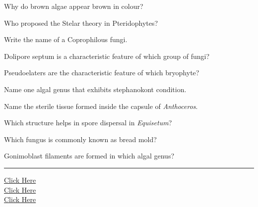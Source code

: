 \documentclass[11pt,a4paper]{article}
\begin{document}
\begin{parts}
  \item Why do brown algae appear brown in colour?
  \item Who proposed the Stelar theory in Pteridophytes?
  \item Write the name of a Coprophilous fungi.
  \item Dolipore septum is a characteristic feature of which group of fungi?
  \item Pseudoelaters are the characteristic feature of which bryophyte?
  \item Name one algal genus that exhibits stephanokont condition.
  \item Name the sterile tissue formed inside the capsule of   \textit{Anthoceros}.
  \item Which structure helps in spore dispersal in   \textit{Equisetum}?
  \item Which fungus is commonly known as bread mold?
  \item Gonimoblast filaments are formed in which algal genus?
\end{parts}

\vfill
\rule{\linewidth}{0.4pt}

\begin{center}\small
\href{https://bhu-exam.vercel.app/}{Click Here}\\[4pt]\href{https://me-aryan.vercel.app/}{Click Here}\\[4pt]\href{https://quashan-me.vercel.app/}{Click Here}
\end{center}
\end{document}
